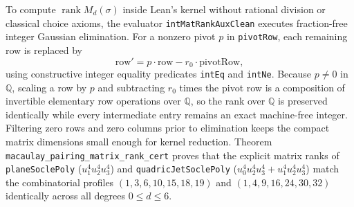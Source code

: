 \documentclass[11pt,a4paper]{article}
\begin{document}
To compute $\operatorname{rank} M_d(\sigma)$ inside Lean's kernel without rational division or classical choice axioms, the evaluator \texttt{intMatRankAuxClean} executes fraction-free integer Gaussian elimination. For a nonzero pivot $p$ in \texttt{pivotRow}, each remaining row is replaced by
\begin{equation}
  \text{row}' = p \cdot \text{row} - r_0 \cdot \text{pivotRow},
\end{equation}
using constructive integer equality predicates \texttt{intEq} and \texttt{intNe}. Because $p \neq 0$ in $\mathbb{Q}$, scaling a row by $p$ and subtracting $r_0$ times the pivot row is a composition of invertible elementary row operations over $\mathbb{Q}$, so the rank over $\mathbb{Q}$ is preserved identically while every intermediate entry remains an exact machine-free integer. Filtering zero rows and zero columns prior to elimination keeps the compact matrix dimensions small enough for kernel reduction. Theorem \texttt{macaulay\_pairing\_matrix\_rank\_cert} proves that the explicit matrix ranks of \texttt{planeSoclePoly} ($u_1^4 u_2^4 u_3^4$) and \texttt{quadricJetSoclePoly} ($u_0^4 u_2^4 u_3^4 + u_1^4 u_2^4 u_3^4$) match the combinatorial profiles $(1, 3, 6, 10, 15, 18, 19)$ and $(1, 4, 9, 16, 24, 30, 32)$ identically across all degrees $0 \le d \le 6$.
\end{document}

